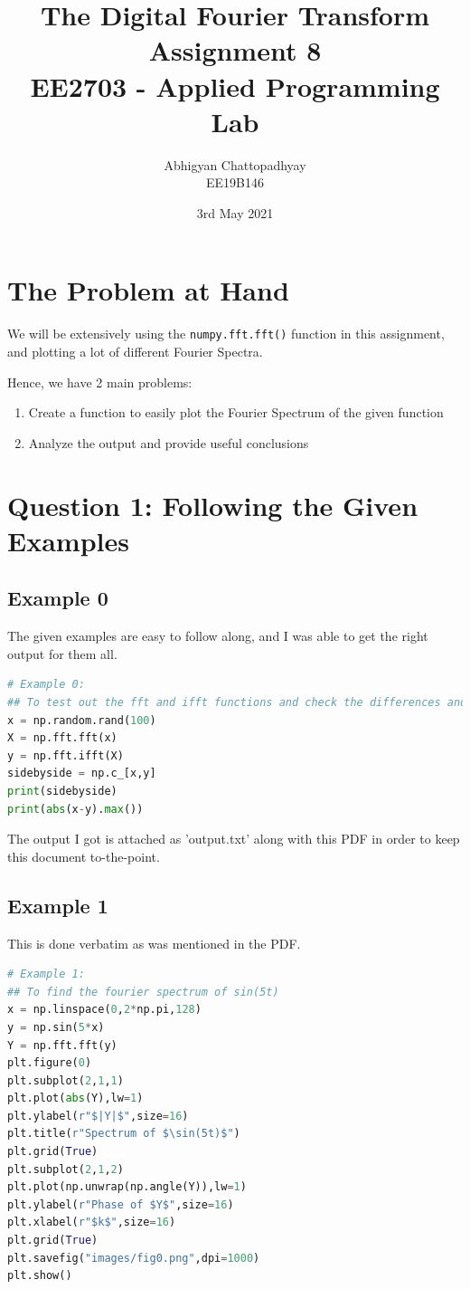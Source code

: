 \documentclass[12pt]{article}
\title{\vspace{-1cm}The Digital Fourier Transform\\
\large Assignment 8\\
\large EE2703 - Applied Programming Lab}
\author{Abhigyan Chattopadhyay \\
EE19B146}
\date{3rd May 2021}
\begin{document}
\maketitle
\tableofcontents
\pagebreak
\section{The Problem at Hand}
We will be extensively using the \texttt{numpy.fft.fft()} function in this assignment, and plotting a lot of different Fourier Spectra.

Hence, we have 2 main problems:
\begin{enumerate}
    \item Create a function to easily plot the Fourier Spectrum of the given function
    \item Analyze the output and provide useful conclusions
\end{enumerate}

\section{Question 1: Following the Given Examples}

\subsection{Example 0}
The given examples are easy to follow along, and I was able to get the right output for them all.

\begin{lstlisting}[language=Python]
# Example 0:
## To test out the fft and ifft functions and check the differences and errors between them
x = np.random.rand(100)
X = np.fft.fft(x)
y = np.fft.ifft(X)
sidebyside = np.c_[x,y]
print(sidebyside)
print(abs(x-y).max())
\end{lstlisting}
The output I got is attached as 'output.txt' along with this PDF in order to keep this document to-the-point.

\subsection{Example 1}
This is done verbatim as was mentioned in the PDF.
\begin{lstlisting}[language=Python]
# Example 1:
## To find the fourier spectrum of sin(5t)
x = np.linspace(0,2*np.pi,128)
y = np.sin(5*x)
Y = np.fft.fft(y)
plt.figure(0)
plt.subplot(2,1,1)
plt.plot(abs(Y),lw=1)
plt.ylabel(r"$|Y|$",size=16)
plt.title(r"Spectrum of $\sin(5t)$")
plt.grid(True)
plt.subplot(2,1,2)
plt.plot(np.unwrap(np.angle(Y)),lw=1)
plt.ylabel(r"Phase of $Y$",size=16)
plt.xlabel(r"$k$",size=16)
plt.grid(True)
plt.savefig("images/fig0.png",dpi=1000)
plt.show()
\end{lstlisting}
\end{document}
